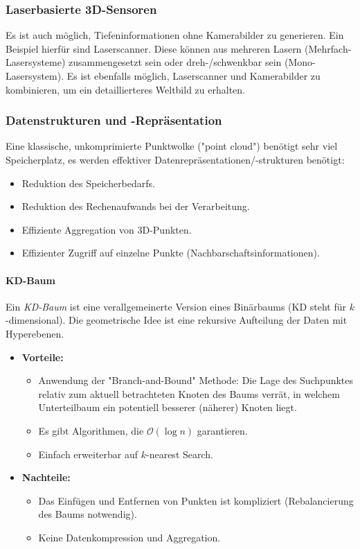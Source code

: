 			\subsubsection{Laserbasierte 3D-Sensoren}
				Es ist auch möglich, Tiefeninformationen ohne Kamerabilder zu generieren. Ein Beispiel hierfür sind Laserscanner. Diese können aus mehreren Lasern (Mehrfach-Lasersysteme) zusammengesetzt sein oder dreh-/schwenkbar sein (Mono-Lasersystem). Es ist ebenfalls möglich, Laserscanner und Kamerabilder zu kombinieren, um ein detaillierteres Weltbild zu erhalten.

			\subsubsection{Datenstrukturen und -Repräsentation}
				Eine klassische, unkomprimierte Punktwolke ("point cloud") benötigt sehr viel Speicherplatz, \dh es werden effektiver Datenrepräsentationen/-strukturen benötigt:
				\begin{itemize}
					\item Reduktion des Speicherbedarfs.
					\item Reduktion des Rechenaufwands bei der Verarbeitung.
					\item Effiziente Aggregation von 3D-Punkten.
					\item Effizienter Zugriff auf einzelne Punkte (\zB Nachbarschaftsinformationen).
				\end{itemize}

				\paragraph{KD-Baum}
					Ein \emph{KD-Baum} ist eine verallgemeinerte Version eines Binärbaums (KD steht für \(k\)-dimensional). Die geometrische Idee ist eine rekursive Aufteilung der Daten mit Hyperebenen.
					
					\begin{itemize}
						\item \textbf{Vorteile:}
							\begin{itemize}
								\item Anwendung der "Branch-and-Bound" Methode: Die Lage des Suchpunktes relativ zum aktuell betrachteten Knoten des Baums verrät, in welchem Unterteilbaum ein potentiell besserer (näherer) Knoten liegt.
								\item Es gibt Algorithmen, die \( \mathcal{O}(\log n) \) garantieren.
								\item Einfach erweiterbar auf \(k\)-nearest Search.
							\end{itemize}
						\item \textbf{Nachteile:}
							\begin{itemize}
								\item Das Einfügen und Entfernen von Punkten ist kompliziert (\ggf Rebalancierung des Baums notwendig).
								\item Keine Datenkompression und Aggregation.
							\end{itemize}
					\end{itemize}

